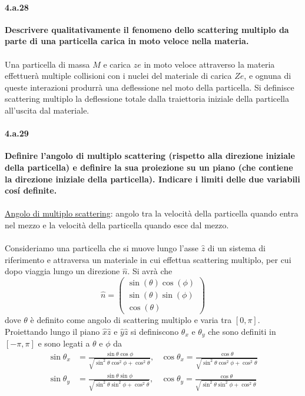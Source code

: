 \documentclass[twoside]{article}
\begin{document}
\paragraph{4.a.28}\textbf{Descrivere qualitativamente il fenomeno dello scattering multiplo da parte di una particella carica in moto veloce nella materia.}\\ \\
Una particella di massa $M$ e carica $ze$ in moto veloce attraverso la materia effettuerà multiple collisioni con i nuclei del materiale di carica $Ze$, e ognuna di queste interazioni produrrà una deflessione nel moto della particella. Si definisce scattering multiplo la deflessione totale dalla traiettoria iniziale della particella all'uscita dal materiale.

\paragraph{4.a.29}\textbf{Definire l'angolo di multiplo scattering (rispetto alla direzione iniziale della particella) e definire la sua proiezione su un piano (che contiene la direzione iniziale della particella). Indicare i limiti delle due variabili cosí definite.}\\ \\
\underline{Angolo di multiplo scattering}: angolo tra la velocità della particella quando entra nel mezzo e la velocità della particella quando esce dal mezzo.\\
\\
Consideriamo una particella che si muove lungo l'asse $\hat{z}$ di un sistema di riferimento e attraversa un materiale in cui effettua scattering multiplo, per cui dopo viaggia lungo un direzione $\hat{n}$. Si avrà che
\begin{equation}
    \hat{n}=
    \begin{pmatrix}
    \sin(\theta)\cos(\phi)\\\sin(\theta)\sin(\phi)\\\cos(\theta)
    \end{pmatrix}
\end{equation}
dove $\theta$ è definito come angolo di scattering multiplo e varia tra $[0, \pi]$. Proiettando lungo il piano $\hat{x}\hat{z}$ e $\hat{y}\hat{z}$ si definiscono $\theta_x$ e $\theta_y$ che sono definiti in $[-\pi,\pi]$ e sono legati a $\theta$ e $\phi$ da
\begin{align}
    \sin\theta_x&=\frac{\sin\theta\cos\phi}{\sqrt{\sin^2\theta\cos^2\phi+\cos^2\theta}},&\cos\theta_x=\frac{\cos\theta}{\sqrt{\sin^2\theta\cos^2\phi+\cos^2\theta}}\\
    \sin\theta_y&=\frac{\sin\theta\sin\phi}{\sqrt{\sin^2\theta\sin^2\phi+\cos^2\theta}},&\cos\theta_y=\frac{\cos\theta}{\sqrt{\sin^2\theta\sin^2\phi+\cos^2\theta}}
\end{align}
\end{document}
